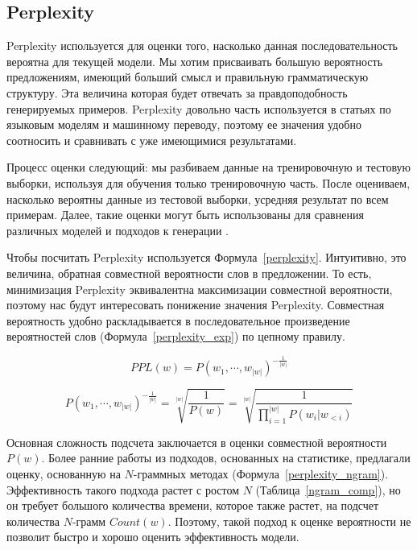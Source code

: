 \documentclass{spbau-diploma}
\begin{document}
\subsection{Perplexity}
Perplexity используется для оценки того, насколько данная последовательность 
вероятна для текущей модели. Мы хотим присваивать большую вероятность 
предложениям, имеющий больший смысл и правильную грамматическую структуру. 
Эта величина которая будет отвечать за правдоподобность генерируемых примеров. 
Perplexity довольно часть используется в статьях по языковым моделям и машинному 
переводу, поэтому ее значения удобно соотносить и 
сравнивать с уже имеющимися результатами.

Процесс оценки следующий: мы разбиваем данные на тренировочную и тестовую 
выборки, используя для обучения только тренировочную часть. После оцениваем,
насколько вероятны данные из тестовой выборки, усредняя результат по всем 
примерам. Далее, такие оценки могут быть использованы для сравнения различных 
моделей и подходов к генерации \cite{lecture:lm}.

Чтобы посчитать Perplexity используется Формула~\ref{perplexity}. Интуитивно,
это величина, обратная совместной вероятности слов в предложении. То есть, 
минимизация Perplexity эквивалентна максимизации совместной вероятности, поэтому
нас будут интересовать понижение значения Perplexity. Совместная вероятность 
удобно раскладывается в последовательное произведение вероятностей слов 
(Формула~\ref{perplexity_exp}) по цепному правилу.

\begin{equation}
\label{perplexity}
PPL(w) = P(w_1, \cdots, w_{|w|}) ^ {-\frac{1}{|w|}}
\end{equation}

\begin{equation}
\label{perplexity_exp}
P(w_1, \cdots, w_{|w|}) ^ {-\frac{1}{|w|}} = \sqrt[|w|]{\frac{1}{P(w)}} = 
\sqrt[|w|]{\frac{1}{\prod^{|w|}_{i=1}{P(w_i | w_{<i})}}}
\end{equation}

Основная сложность подсчета заключается в оценки совместной вероятности $P(w)$.
Более ранние работы из подходов, основанных на статистике, предлагали оценку, 
основанную на $N$-граммных методах (Формула~\ref{perplexity_ngram}). 
Эффективность такого подхода растет с ростом $N$ (Таблица~\ref{ngram_comp}), 
но он требует большого количества времени, которое также растет, на подсчет 
количества $N$-грамм $Count(w)$. 
Поэтому, такой подход к оценке вероятности не позволит быстро и хорошо оценить 
эффективность модели.
\end{document}
